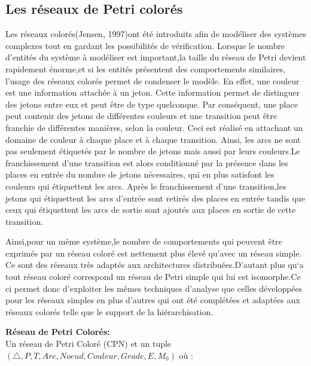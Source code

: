 \subsection{Les réseaux de Petri colorés}
Les réseaux colorés(Jensen, 1997)ont été introduits afin de modéliser des systèmes complexes tout en gardant les possibilités de vérification. Lorsque le nombre d'entités du système à modéliser est important,la taille du réseau de Petri devient rapidement énorme,et si les entités présentent des comportements similaires, l'usage des réseaux colorés permet de condenser le modèle. En effet, une couleur est une information attachée à un jeton. Cette information permet de distinguer des jetons entre eux et peut être de type quelconque. Par conséquent, une place peut contenir des jetons de différentes couleurs et une transition peut être franchie de différentes manières, selon la couleur. Ceci est réalisé en attachant un domaine de couleur à chaque place et à chaque transition. Ainsi, les arcs ne sont pas seulement étiquetés par le nombre de jetons mais aussi par leurs couleurs.Le franchissement d'une transition est alors conditionné par la présence dans les places en entrée du nombre de jetons nécessaires, qui en plus satisfont les couleurs qui étiquettent les arcs. Après le franchissement d'une transition,les jetons qui étiquettent les arcs d'entrée sont retirés des places en entrée tandis que ceux qui étiquettent les arcs de sortie sont ajoutés aux places en sortie de cette transition.

Ainsi,pour un même système,le nombre de comportements qui peuvent être exprimés par un réseau coloré est nettement plus élevé qu’avec un réseau simple. Ce sont des réseaux très adaptés aux architectures distribuées.D'autant plus qu`a tout réseau coloré correspond un réseau de Petri simple qui lui est isomorphe.Ce ci permet donc d'exploiter les mêmes techniques d'analyse que celles développées pour les réseaux simples en plus d'autres qui ont été complétées et adaptées aux réseaux colorés telle que le support de la
hiérarchisation.

\begin{defn}\textbf{Réseau de Petri Colorés:}\\
	Un réseau de Petri Coloré (CPN) et un tuple $(\bigtriangleup,P,T,Arc,Noeud,Couleur,Grade,E,M_{0}) $ où :
	
	
\end{defn}


